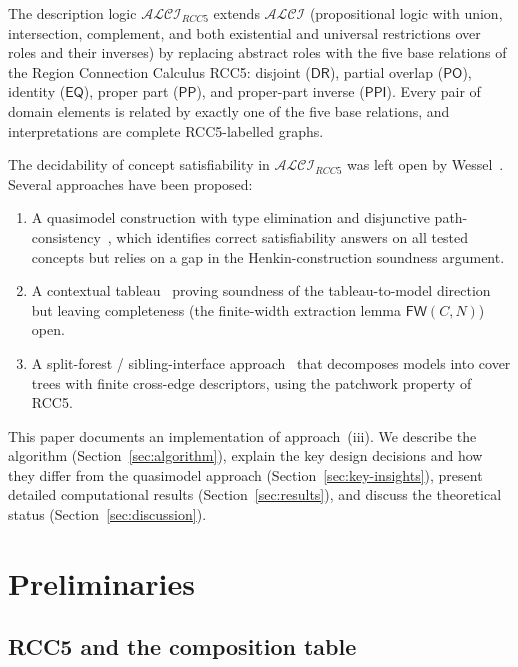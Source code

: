 \documentclass[a4paper,11pt]{article}
\theoremstyle{definition}
\newcommand{\ALCI}{\ensuremath{\mathcal{ALCI}}}
\newcommand{\ALCIRCC}[1]{\ensuremath{\mathcal{ALCI}_{\mathit{RCC#1}}}}
\newcommand{\DR}{\ensuremath{\mathsf{DR}}}
\newcommand{\PO}{\ensuremath{\mathsf{PO}}}
\newcommand{\EQ}{\ensuremath{\mathsf{EQ}}}
\newcommand{\PP}{\ensuremath{\mathsf{PP}}}
\newcommand{\PPI}{\ensuremath{\mathsf{PPI}}}
\begin{document}
The description logic $\ALCIRCC{5}$ extends $\ALCI$ (propositional
logic with union, intersection, complement, and both existential and
universal restrictions over roles and their inverses) by replacing
abstract roles with the five base relations of the Region Connection
Calculus RCC5: disjoint ($\DR$), partial overlap ($\PO$), identity
($\EQ$), proper part ($\PP$), and proper-part inverse ($\PPI$).
Every pair of domain elements is related by exactly one of the five
base relations, and interpretations are complete RCC5-labelled graphs.

The decidability of concept satisfiability in $\ALCIRCC{5}$ was left
open by Wessel~\cite{Wessel2003,Wessel2002}.
Several approaches have been proposed:
\begin{enumerate}[label=(\roman*)]
  \item A quasimodel construction with type elimination and
    disjunctive path-consistency~\cite{ClaudeDecidability}, which
    identifies correct satisfiability answers on all tested concepts
    but relies on a gap in the Henkin-construction soundness argument.
  \item A contextual tableau~\cite{GPTContextual} proving soundness
    of the tableau-to-model direction but leaving completeness
    (the finite-width extraction lemma $\mathsf{FW}(C,N)$) open.
  \item A split-forest / sibling-interface
    approach~\cite{SiblingCompleted,CoverTree} that decomposes
    models into cover trees with finite cross-edge descriptors,
    using the patchwork property of RCC5.
\end{enumerate}

This paper documents an implementation of approach~(iii).
We describe the algorithm (Section~\ref{sec:algorithm}), explain
the key design decisions and how they differ from the quasimodel
approach (Section~\ref{sec:key-insights}), present detailed
computational results (Section~\ref{sec:results}), and discuss
the theoretical status (Section~\ref{sec:discussion}).


\section{Preliminaries}
\label{sec:prelim}

\subsection{RCC5 and the composition table}
\end{document}
